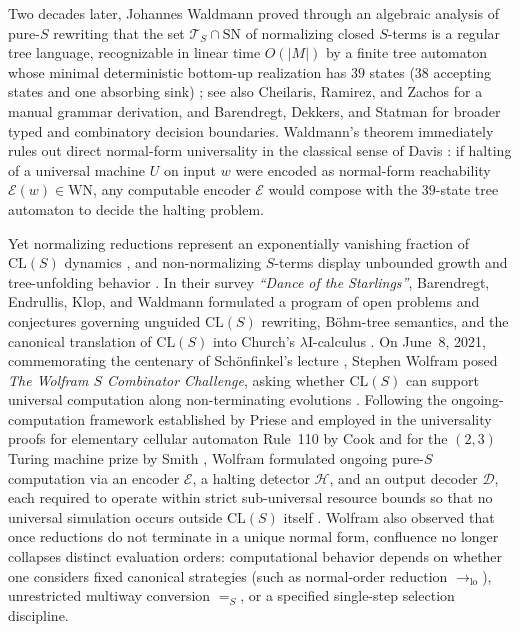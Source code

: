\documentclass[11pt,reqno]{amsart}
\numberwithin{equation}{section}
\theoremstyle{plain}
\theoremstyle{definition}
\theoremstyle{remark}
\newcommand{\CLS}{\mathrm{CL}(S)}
\newcommand{\TS}{\mathcal{T}_S}
\newcommand{\SN}{\mathrm{SN}}
\newcommand{\WN}{\mathrm{WN}}
\newcommand{\convS}{=_S}
\begin{document}
Two decades later, Johannes Waldmann proved through an algebraic analysis of pure-$S$ rewriting that the set $\TS \cap \SN$ of normalizing closed $S$-terms is a regular tree language, recognizable in linear time $O(|M|)$ by a finite tree automaton \cite{Waldmann1997,Waldmann1998RTA,Waldmann1998Thesis,Waldmann2000} whose minimal deterministic bottom-up realization has $39$ states ($38$ accepting states and one absorbing sink) \cite{EndrullisDeVrijerWaldmann2010,BarendregtEndrullisKlopWaldmann2017}; see also Cheilaris, Ramirez, and Zachos \cite{CheilarisRamirezZachos2011} for a manual grammar derivation, and Barendregt, Dekkers, and Statman \cite{BarendregtDekkersStatman2013} for broader typed and combinatory decision boundaries. Waldmann's theorem immediately rules out direct normal-form universality in the classical sense of Davis \cite{Davis1957DefUTM}: if halting of a universal machine $U$ on input $w$ were encoded as normal-form reachability $\mathcal{E}(w) \in \WN$, any computable encoder $\mathcal{E}$ would compose with the $39$-state tree automaton to decide the halting problem.

Yet normalizing reductions represent an exponentially vanishing fraction of $\CLS$ dynamics \cite{BendkowskiGrygielZaionc2017}, and non-normalizing $S$-terms display unbounded growth and tree-unfolding behavior \cite{Wolfram2021CombinatorsBook}. In their survey \emph{``Dance of the Starlings''}, Barendregt, Endrullis, Klop, and Waldmann \cite{BarendregtEndrullisKlopWaldmann2017} formulated a program of open problems and conjectures governing unguided $\CLS$ rewriting, B\"ohm-tree semantics, and the canonical translation of $\CLS$ into Church's $\lambda\mathrm{I}$-calculus \cite{Church1941}. On June~8, 2021, commemorating the centenary of Sch\"onfinkel's lecture \cite{Wolfram2020StoryOfComputation,Wolfram2021CombinatorsBook}, Stephen Wolfram posed \emph{The Wolfram $S$ Combinator Challenge}, asking whether $\CLS$ can support universal computation along non-terminating evolutions \cite{Wolfram2021Challenge}. Following the ongoing-computation framework established by Priese \cite{Priese1979ComplexityUTM} and employed in the universality proofs for elementary cellular automaton Rule~110 by Cook \cite{Cook2004Rule110} and for the $(2,3)$ Turing machine prize by Smith \cite{Smith2020TM23,Wolfram2007PrizeWon}, Wolfram formulated ongoing pure-$S$ computation via an encoder $\mathcal{E}$, a halting detector $\mathcal{H}$, and an output decoder $\mathcal{D}$, each required to operate within strict sub-universal resource bounds so that no universal simulation occurs outside $\CLS$ itself \cite{Wolfram2021Challenge,vanEmdeBoas1990Models}. Wolfram also observed that once reductions do not terminate in a unique normal form, confluence no longer collapses distinct evaluation orders: computational behavior depends on whether one considers fixed canonical strategies (such as normal-order reduction $\to_{\mathrm{lo}}$), unrestricted multiway conversion $\convS$, or a specified single-step selection discipline.
\end{document}

